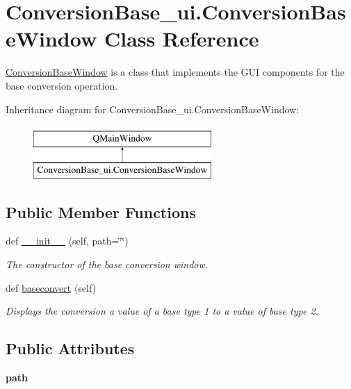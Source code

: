 \hypertarget{class_conversion_base__ui_1_1_conversion_base_window}{}\section{Conversion\+Base\+\_\+ui.\+Conversion\+Base\+Window Class Reference}
\label{class_conversion_base__ui_1_1_conversion_base_window}


\hyperlink{class_conversion_base__ui_1_1_conversion_base_window}{Conversion\+Base\+Window} is a class that implements the G\+UI components for the base conversion operation.  


Inheritance diagram for Conversion\+Base\+\_\+ui.\+Conversion\+Base\+Window\+:\begin{figure}[H]
\begin{center}
\leavevmode
\includegraphics[height=2.000000cm]{class_conversion_base__ui_1_1_conversion_base_window}
\end{center}
\end{figure}
\subsection*{Public Member Functions}
\begin{DoxyCompactItemize}
\item 
def \hyperlink{class_conversion_base__ui_1_1_conversion_base_window_af8fe79c29cebc3c67c6260fe661872da}{\+\_\+\+\_\+init\+\_\+\+\_\+} (self, path=\char`\"{}\char`\"{})
\begin{DoxyCompactList}\small\item\em The constructor of the base conversion window. \end{DoxyCompactList}\item 
def \hyperlink{class_conversion_base__ui_1_1_conversion_base_window_af4bcf9d2cda570924af0efe9302f1c92}{baseconvert} (self)
\begin{DoxyCompactList}\small\item\em Displays the conversion a value of a base type 1 to a value of base type 2. \end{DoxyCompactList}\end{DoxyCompactItemize}
\subsection*{Public Attributes}
\begin{DoxyCompactItemize}
\item 
\mbox{\label{class_conversion_base__ui_1_1_conversion_base_window_a1951c0b3099533052162596c673e0b3d}} 
{\bfseries path}
\end{DoxyCompactItemize}


